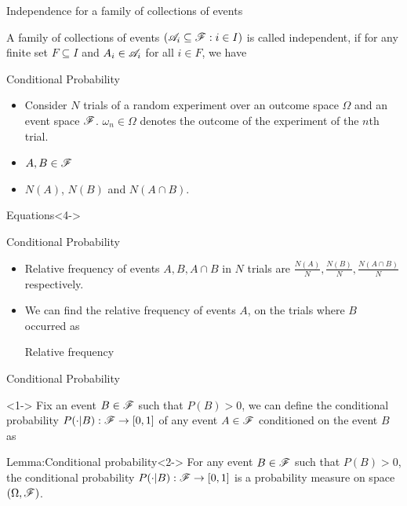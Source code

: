 \documentclass[12pt,aspectratio=169]{beamer}
\begin{document}
\begin{frame}{Independence for a family of collections of events}
\begin{Definition}
A family of collections of events $(\mathscr{A}_i \subseteq \mathscr{F}: i \in I)$ is called independent,
if for any finite set $F \subseteq I$ and $A_i \in \mathscr{A}_i$ for all $i \in F$, we have 
\end{Definition}
\end{frame}
\begin{frame}{Conditional Probability}
\begin{itemize}
\item <1-> Consider $N$ trials of a random experiment over an outcome space $\Omega$ and an event space $\mathscr{F}$. $\omega_n \in \Omega$ denotes the outcome of the experiment of the $n$th trial. 
\item <2-> $A, B \in \mathscr{F}$
\item <3-> $N(A)$, $N(B)$ and $N(A\cap B)$. 
\end{itemize}
\begin{block}{Equations}<4->
\end{block}
\end{frame}
\begin{frame}{Conditional Probability}
\begin{itemize}
\item <1-> Relative frequency of events $A, B, A\cap B$ in $N$ trials are $\frac{N(A)}{N}, \frac{N(B)}{N}, \frac{N(A\cap B)}{N}$ respectively.  
\item <2-> We can find the relative frequency of events $A$, on the trials where $B$ occurred as 
\begin{block}{Relative frequency}
\end{block}
\end{itemize}
\end{frame}
\begin{frame}{Conditional Probability}
\begin{Definition}<1->
Fix an event $B \in \mathscr{F}$ such that $P(B) > 0$, we can define the conditional probability $P(\cdot | B): \mathscr{F} \to [0,1]$ of any event $A \in \mathscr{F}$ conditioned on the event $B$ as 
\end{Definition}
\begin{block}{Lemma:Conditional probability}<2->
For any event $B \in \mathscr{F}$ such that $P(B) > 0$, the conditional probability $P(\cdot | B): \mathscr{F} \to [0,1]$ is a probability measure on space $(\Omega, \mathscr{F})$. 
\end{block}
\end{frame}
\end{document}
